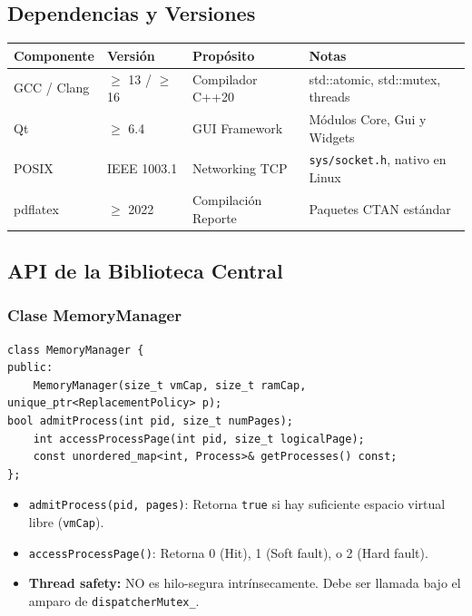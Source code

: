 \documentclass[12pt,letterpaper]{article}
\begin{document}
\subsection{Dependencias y Versiones}

\begin{table}[H]
\centering
{}
\begin{tabular}{@{}llll@{}}
\toprule
\rowcolor{catBlue!40}
\textbf{Componente} & \textbf{Versión} & \textbf{Propósito}
& \textbf{Notas} \\ \midrule
GCC / Clang & $\ge$ 13 / $\ge$ 16 & Compilador C++20 & std::atomic, std::mutex, threads \\
Qt & $\ge$ 6.4 & GUI Framework & Módulos Core, Gui y Widgets \\
POSIX & IEEE 1003.1 & Networking TCP & \texttt{sys/socket.h}, nativo en Linux \\
pdflatex & $\ge$ 2022 & Compilación Reporte & Paquetes CTAN estándar \\ \bottomrule
\end{tabular}
\end{table}

\subsection{API de la Biblioteca Central}

\subsubsection{Clase MemoryManager}
\begin{tcolorbox}[codebox, title={Sinopsis}]
\begin{lstlisting}
class MemoryManager {
public:
    MemoryManager(size_t vmCap, size_t ramCap, unique_ptr<ReplacementPolicy> p);
bool admitProcess(int pid, size_t numPages);
    int accessProcessPage(int pid, size_t logicalPage);
    const unordered_map<int, Process>& getProcesses() const;
};
\end{lstlisting}
\end{tcolorbox}
\begin{itemize}
    \item \texttt{admitProcess(pid, pages)}: Retorna \texttt{true} si hay suficiente espacio virtual libre (\texttt{vmCap}).
\item \texttt{accessProcessPage()}: Retorna 0 (Hit), 1 (Soft fault), o 2 (Hard fault).
    \item \textbf{Thread safety:} NO es hilo-segura intrínsecamente.
Debe ser llamada bajo el amparo de \texttt{dispatcherMutex\_}.
\end{itemize}
\end{document}

